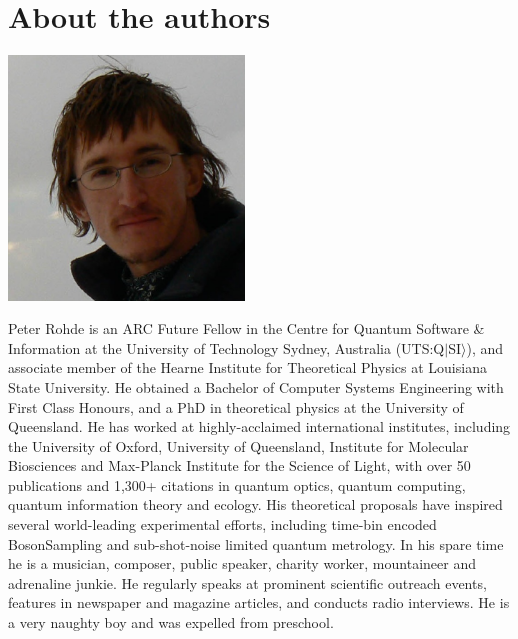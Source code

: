 %
%

\section*{About the authors}






%
%

\begin{center}
\includegraphics[width=0.47\textwidth]{photo_peter_rohde}
\end{center}

Peter Rohde is an ARC Future Fellow in the Centre for Quantum Software \& Information at the University of Technology Sydney, Australia (UTS:Q$|$SI$\rangle$), and associate member of the Hearne Institute for Theoretical Physics at Louisiana State University. He obtained a Bachelor of Computer Systems Engineering with First Class Honours, and a PhD in theoretical physics at the University of Queensland. He has worked at highly-acclaimed international institutes, including the University of Oxford, University of Queensland, Institute for Molecular Biosciences and Max-Planck Institute for the Science of Light, with over 50 publications and 1,300+ citations in quantum optics, quantum computing, quantum information theory and ecology. His theoretical proposals have inspired several world-leading experimental efforts, including time-bin encoded {\sc BosonSampling} and sub-shot-noise limited quantum metrology. In his spare time he is a musician, composer, public speaker, charity worker, mountaineer and adrenaline junkie. He regularly speaks at prominent scientific outreach events, features in newspaper and magazine articles, and conducts radio interviews. He is a very naughty boy and was expelled from preschool.


